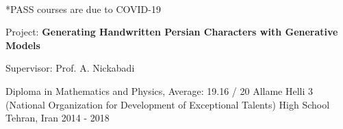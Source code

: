 \begin{cventries}
{\begin{cvitems}
{\begin{adjustwidth}{4mm}{}
\begin{tabular}{l@{\hskip 5mm}l@{\hskip 5mm}l}
            \end{tabular}
            \\[1mm]
            {\fontsize{8pt}{1em}\bodyfontlight\upshape\color{text} *PASS courses are due to COVID-19}
          	\medskip
          \end{adjustwidth}
        }
        \item{
          Project: \textbf{Generating Handwritten Persian Characters with Generative Models}
        }
        \item{
          Supervisor: Prof. A. Nickabadi
        }
      \end{cvitems}
    }

  \cventry
    {Diploma in Mathematics and Physics, Average: 19.16 / 20} %
    {{\fontsize{9.8pt}{1em}\bodyfont Allame Helli 3 (National Organization for Development of Exceptional Talents) High School}}
    {Tehran, Iran} %
    {2014 - 2018} %
    {} \vspace*{-5mm}

\end{cventries}
